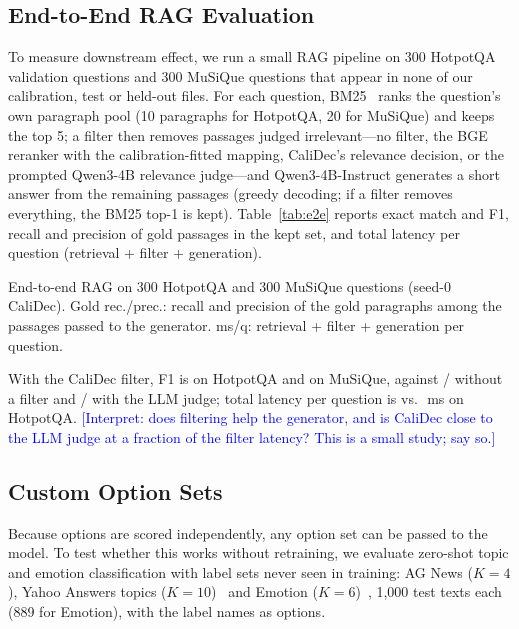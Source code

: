 \documentclass[twocolumn]{ICCKjournal}
\newcommand{\revnote}[1]{\textcolor{blue}{[#1]}}
\begin{document}
\subsection{End-to-End RAG Evaluation}
\label{sec:e2e}
To measure downstream effect, we run a small RAG pipeline on 300 HotpotQA validation questions and 300 MuSiQue questions that appear in none of our calibration, test or held-out files. For each question, BM25~\cite{robertson2009bm25} ranks the question's own paragraph pool (10 paragraphs for HotpotQA, 20 for MuSiQue) and keeps the top 5; a filter then removes passages judged irrelevant---no filter, the BGE reranker with the calibration-fitted mapping, CaliDec's relevance decision, or the prompted Qwen3-4B relevance judge---and Qwen3-4B-Instruct generates a short answer from the remaining passages (greedy decoding; if a filter removes everything, the BM25 top-1 is kept). Table~\ref{tab:e2e} reports exact match and F1, recall and precision of gold passages in the kept set, and total latency per question (retrieval + filter + generation).

\begin{table}[H]
\caption{End-to-end RAG on 300 HotpotQA and 300 MuSiQue questions (seed-0 CaliDec). Gold rec./prec.: recall and precision of the gold paragraphs among the passages passed to the generator. ms/q: retrieval + filter + generation per question.}
\label{tab:e2e}
\centering
\small
\begin{adjustbox}{max width=\linewidth}

\end{adjustbox}
\end{table}

With the CaliDec filter, F1 is \EEHotNJFone{} on HotpotQA and \EEMusNJFone{} on MuSiQue, against \EEHotNoneFone{} / \EEMusNoneFone{} without a filter and \EEHotQwenFone{} / \EEMusQwenFone{} with the LLM judge; total latency per question is \EEHotNJMs{} vs.\ \EEHotQwenMs{}\,ms on HotpotQA. \revnote{Interpret: does filtering help the generator, and is CaliDec close to the LLM judge at a fraction of the filter latency? This is a small study; say so.}

\subsection{Custom Option Sets}
\label{sec:custom}
Because options are scored independently, any option set can be passed to the model. To test whether this works without retraining, we evaluate zero-shot topic and emotion classification with label sets never seen in training: AG News ($K=4$), Yahoo Answers topics ($K=10$)~\cite{zhang2015character} and Emotion ($K=6$)~\cite{saravia2018carer}, 1,000 test texts each (889 for Emotion), with the label names as options.
\end{document}
